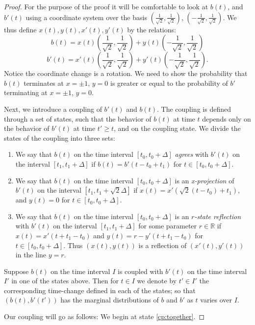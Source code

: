 {\begin{proof}
For the purpose of the proof it will be comfortable to look at $b(t)$, and $b'(t)$ using a coordinate system over the basis $(\frac 1 {\sqrt 2},\frac 1 {\sqrt 2})$, $(-\frac 1 {\sqrt 2},\frac 1 {\sqrt 2})$. We thus define $x(t), y(t), x'(t), y'(t)$ by the relations:
$$b(t)=x(t)(\frac 1 {\sqrt 2},\frac 1 {\sqrt 2})+y(t)(-\frac 1 {\sqrt 2},\frac 1 {\sqrt 2})$$
$$b'(t)=x'(t)(\frac 1 {\sqrt 2},\frac 1 {\sqrt 2})+y'(t)(-\frac 1 {\sqrt 2},\frac 1 {\sqrt 2}).$$
Notice the coordinate change is a rotation. We need to show the probability that $b(t)$ terminates at $x=\pm 1$, $y=0$ is greater or equal to the probability of $b'$ terminating at $x=\pm 1$, $y=0$.

Next, we introduce a coupling of $b'(t)$ and $b(t)$. The coupling is defined through a set of states, such that the behavior of $b(t)$ at time $t$ depends only on the behavior of $b'(t)$ at time $t'\ge t$, and on the coupling state. We divide the states of the coupling into three sets:

\begin{enumerate}
\item \label{cp:together} We say that $b(t)$ on the time interval $[t_0,t_0+\Delta]$ \emph{agrees}
 with $b'(t)$ on the interval $[t_1,t_1+\Delta]$ if
$b(t)=b'(t-t_0+t_1)$ for $t\in[t_0,t_0+\Delta]$.

\item\label{cp:shadow} We say that $b(t)$ on the time interval $[t_0,t_0+\Delta]$
is an \emph{x-projection} of $b'(t)$ on the interval $[t_1,t_1+\sqrt2\Delta]$ if $x(t)=x'(\sqrt2(t-t_0)+t_1)$, and $y(t)=0$ for $t\in[t_0,t_0+\Delta]$.

\item\label{cp:mirror} We say that $b(t)$ on the time interval $[t_0,t_0+\Delta]$ is
 an \emph{$r$-state reflection} with $b'(t)$ on the interval $[t_1,t_1+\Delta]$
for some parameter $r\in\mathbb{R}$ if $x(t)=x'(t+t_1-t_0)$ and
$y(t)=r-y'(t+t_1-t_0)$ for $t\in[t_0,t_0+\Delta]$. Thus $(x(t),y(t))$ is a reflection of $(x'(t),y'(t))$ in the line $y=r$.
\end{enumerate}

Suppose $b(t)$ on the time interval $I$ is coupled with $b'(t)$ on the time interval $I'$ in one of the states above. Then for $t\in I$ we denote by $t'\in I'$ the corresponding time-change defined in each of the states; so that $(b(t),b'(t'))$ has the marginal distributions of $b$ and $b'$ as $t$ varies over $I$.

Our coupling will go as follows: We begin at state \ref{cp:together}.


\end{proof}}
